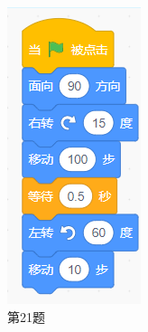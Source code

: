 \documentclass[10pt, a4paper]{article}
\begin{document}
\begin{enumerate}
\begin{figure}[htbp]
\begin{minipage}[t]{.1\textwidth}
                \caption*{第21题}
            \end{minipage}
            \begin{minipage}[t]{.3\textwidth}
                \centering
                \begin{minipage}[t]{.4\textwidth}
                    \centering
                    \includegraphics[width=\textwidth]{22-1.png}

\end{minipage}
\end{minipage}
\end{figure}
\end{enumerate}
\end{document}
